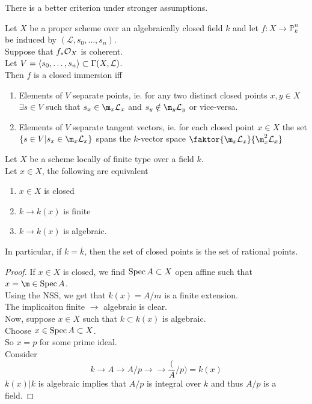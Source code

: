 \documentclass[../main.tex]{subfiles}
\begin{document}
There is a better criterion under stronger assumptions.
\begin{propo}
Let $X$ be a proper scheme over an algebraically closed field $k$ and let $f:X\to \mathbb{P}^{n}_k$ be induced by $ ( \mathcal{L}, s_0,\ldots,s_n) $.\\
Suppose that $f_\ast\mathcal{O}_X$ is coherent.\\
Let $V= \left\langle s_0,\ldots,s_n\right\rangle \subset \Gamma( X, \mathcal{L}) $.\\
Then $f$ is a closed immersion iff
\begin{enumerate}
\item Elements of $V$ separate points, ie. for any two distinct closed points $x,y \in X$ $\exists s\in V$ such that $s_x \in \m_x \mathcal{L}_x$ and $s_y \notin \m_y \mathcal{L}_y$ or vice-versa.
\item Elements of $V$ separate tangent vectors, ie. for each closed point $x\in X$ the set $ \left\{ s\in V|s_x\in \m_x \mathcal{L}_x \right\} $ spans the $k$-vector space $ \faktor{\m_x \mathcal{L}_x}{\m_x^{2} \mathcal{L}_x}$ 
\end{enumerate}
\end{propo}
\begin{lemma}
Let $X$ be a scheme locally of finite type over a field $k$.\\
Let $x\in X$, the following are equivalent
\begin{enumerate}
\item $x\in X$ is closed
\item $k \to k( x) $ is finite
\item $k \to k( x) $ is algebraic.
\end{enumerate}
In particular, if $k= \overline{k}$, then the set of closed points is the set of rational points.
\end{lemma}
\begin{proof}
If $x\in X$ is closed, we find $\operatorname{Spec} A \subset X$ open affine such that $x= \m \in \spec A$.\\
Using the NSS, we get that $k( x) = A /m$ is a finite extension.\\
The implicaiton finite $\to$ algebraic is clear.\\
Now, suppose $x\in X$ such that $k \subset k( x) $ is algebraic.\\
Choose $x\in \operatorname{Spec} A \subset X$.\\
So $x= p $ for some prime ideal.\\
Consider
\[ 
k \to A \to A /p \to \to \frac ( A /p) = k( x) 
\]
$k( x)|k  $ is algebraic implies that $ A/p$ is integral over $k$ and thus $A /p$ is a field.
\end{proof}
\end{document}

